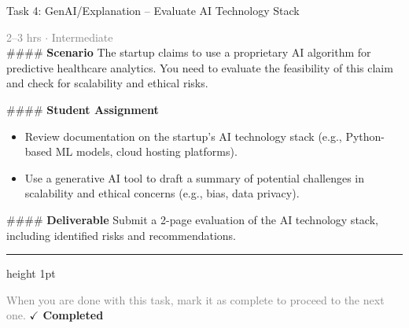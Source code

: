 \documentclass[10pt,a4paper]{article}
\begin{document}
\begin{taskbox}{Task 4: GenAI/Explanation – Evaluate AI Technology Stack}

    {\small \textcolor{gray}{2--3 hrs $\cdot$ Intermediate}}\\[12pt]

    \#\#\#\# \textbf{Scenario}  
The startup claims to use a proprietary AI algorithm for predictive healthcare analytics. You need to evaluate the feasibility of this claim and check for scalability and ethical risks.  

\#\#\#\# \textbf{Student Assignment}  
\begin{itemize}
    \item Review documentation on the startup’s AI technology stack (e.g., Python-based ML models, cloud hosting platforms).  
    \item Use a generative AI tool to draft a summary of potential challenges in scalability and ethical concerns (e.g., bias, data privacy).  
\end{itemize}

\#\#\#\# \textbf{Deliverable}  
Submit a 2-page evaluation of the AI technology stack, including identified risks and recommendations.\par

    \vspace{16pt}

    \textcolor{cardBorder}{\hrule height 1pt}\vspace{8pt}

    \small \textcolor{gray}{When you are done with this task, mark it as complete to proceed to the next one.} \hfill \textbf{\textcolor{brandDark}{$\checkmark$ Completed}}

\end{taskbox}
\end{document}
